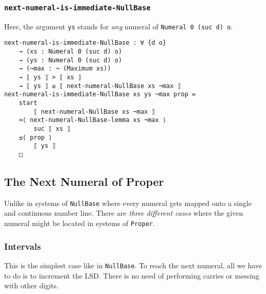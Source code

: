 \documentclass[\main/thesis.tex]{subfiles}
\begin{document}
\subsubsection{{\lstinline|next-numeral-is-immediate-NullBase|}}

Here, the argument {\lstinline|ys|} stands for \textit{any} numeral of {\lstinline|Numeral 0 (suc d) o|}.

\begin{lstlisting}
next-numeral-is-immediate-NullBase : ∀ {d o}
    → (xs : Numeral 0 (suc d) o)
    → (ys : Numeral 0 (suc d) o)
    → (¬max : ¬ (Maximum xs))
    → ⟦ ys ⟧ > ⟦ xs ⟧
    → ⟦ ys ⟧ ≥ ⟦ next-numeral-NullBase xs ¬max ⟧
next-numeral-is-immediate-NullBase xs ys ¬max prop =
    start
        ⟦ next-numeral-NullBase xs ¬max ⟧
    ≈⟨ next-numeral-NullBase-lemma xs ¬max ⟩
        suc ⟦ xs ⟧
    ≤⟨ prop ⟩
        ⟦ ys ⟧
    □
\end{lstlisting}

\subsection{The Next Numeral of Proper}

Unlike in systems of {\lstinline|NullBase|} where every numeral gets mapped onto
a single and continuous number line.
There are \textit{three different cases} where the given numeral might be located
in systems of {\lstinline|Proper|}.

\subsubsection{Intervals}

This is the simplest case like in {\lstinline|NullBase|}.
To reach the next numeral, all we have to do is to increment the LSD.
There is no need of performing carries or messing with other digits.
\end{document}
